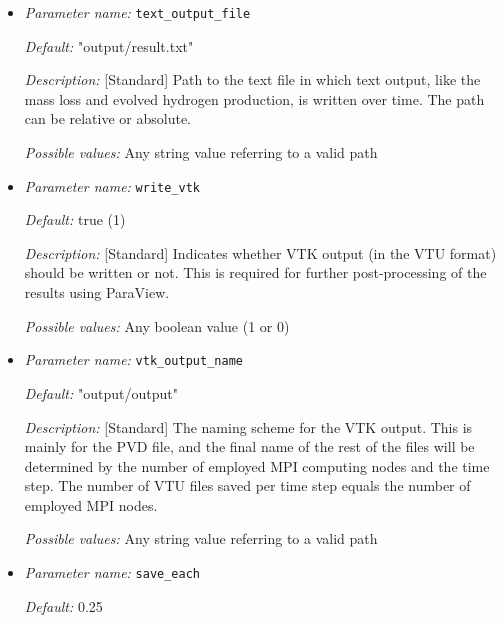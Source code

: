 \begin{itemize}
\item {\it Parameter name:} {\tt text\_output\_file}
\label{parameters:text_output_file}


{\it Default:} "output/result.txt"

{\it Description:} [Standard] Path to the text file in which text output, like the mass loss and evolved hydrogen production, is written over time. The path can be relative or absolute.

{\it Possible values:} Any string value referring to a valid path


\item {\it Parameter name:} {\tt write\_vtk}
\label{parameters:write_vtk}


{\it Default:} true (1)

{\it Description:} [Standard] Indicates whether VTK output (in the VTU format) should be written or not. This is required for further post-processing of the results using ParaView.

{\it Possible values:} Any boolean value (1 or 0)


\item {\it Parameter name:} {\tt vtk\_output\_name}
\label{parameters:vtk_output_name}


{\it Default:} "output/output"

{\it Description:} [Standard] The naming scheme for the VTK output. This is mainly for the PVD file, and the final name of the rest of the files will be determined by the number of employed MPI computing nodes and the time step. The number of VTU files saved per time step equals the number of employed MPI nodes.

{\it Possible values:} Any string value referring to a valid path


\item {\it Parameter name:} {\tt save\_each}
\label{parameters:save_each}


{\it Default:} 0.25


\end{itemize}
